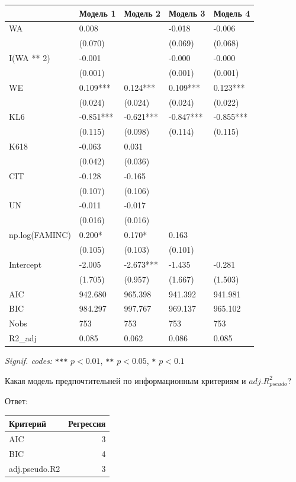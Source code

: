 \documentclass[
  russian,
]{article}
\newcounter{none} %
\begin{document}
{\def\LTcaptype{none} %
\begin{longtable}[]{@{}lllll@{}}
\toprule\noalign{}
& Модель 1 & Модель 2 & Модель 3 & Модель 4 \\
\midrule\noalign{}
\endhead
\bottomrule\noalign{}
\endlastfoot
WA & 0.008 & & -0.018 & -0.006 \\
& (0.070) & & (0.069) & (0.068) \\
I(WA ** 2) & -0.001 & & -0.000 & -0.000 \\
& (0.001) & & (0.001) & (0.001) \\
WE & 0.109*** & 0.124*** & 0.109*** & 0.123*** \\
& (0.024) & (0.024) & (0.024) & (0.022) \\
KL6 & -0.851*** & -0.621*** & -0.847*** & -0.855*** \\
& (0.115) & (0.098) & (0.114) & (0.115) \\
K618 & -0.063 & 0.031 & & \\
& (0.042) & (0.036) & & \\
CIT & -0.128 & -0.165 & & \\
& (0.107) & (0.106) & & \\
UN & -0.011 & -0.017 & & \\
& (0.016) & (0.016) & & \\
np.log(FAMINC) & 0.200* & 0.170* & 0.163 & \\
& (0.105) & (0.103) & (0.101) & \\
Intercept & -2.005 & -2.673*** & -1.435 & -0.281 \\
& (1.705) & (0.957) & (1.667) & (1.503) \\
AIC & 942.680 & 965.398 & 941.392 & 941.981 \\
BIC & 984.297 & 997.767 & 969.137 & 965.102 \\
Nobs & 753 & 753 & 753 & 753 \\
R2\_adj & 0.085 & 0.062 & 0.086 & 0.085 \\
\end{longtable}
}

\emph{Signif. codes:} \texttt{***} \(p<0.01\), \texttt{**} \(p<0.05\),
\texttt{*} \(p<0.1\)

Какая модель предпочтительней по информационным критериям и
\(adj.R^2_{pseudo}\)?

Ответ:

{\def\LTcaptype{none} %
\begin{longtable}[]{@{}lr@{}}
\toprule\noalign{}
Критерий & Регрессия \\
\midrule\noalign{}
\endhead
\bottomrule\noalign{}
\endlastfoot
AIC & 3 \\
BIC & 4 \\
adj.pseudo.R2 & 3 \\
\end{longtable}
}
\end{document}
